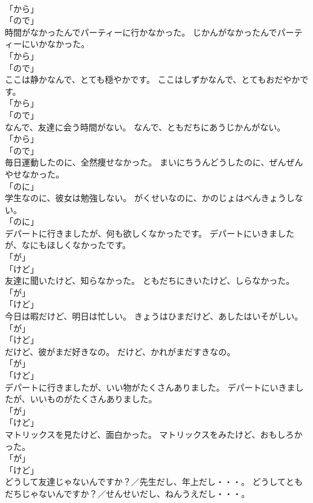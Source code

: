 \documentclass[8pt]{extreport}
\begin{document}
\begin{CJK}{UTF8}{min}
\\	「から」 
\\	「ので」	
\\	時間がなかったんでパーティーに行かなかった。	じかんがなかったんでパーティーにいかなかった。	
\\	「から」 
\\	「ので」	
\\	ここは静かなんで、とても穏やかです。	ここはしずかなんで、とてもおだやかです。	
\\	「から」 
\\	「ので」	
\\	なんで、友達に会う時間がない。	なんで、ともだちにあうじかんがない。	
\\	「から」 
\\	「ので」	
\\	毎日運動したのに、全然痩せなかった。	まいにちうんどうしたのに、ぜんぜんやせなかった。	
\\	「のに」 
\\	学生なのに、彼女は勉強しない。	がくせいなのに、かのじょはべんきょうしない。	
\\	「のに」 
\\	デパートに行きましたが、何も欲しくなかったです。	デパートにいきましたが、なにもほしくなかったです。	
\\	「が」 
\\	「けど」	
\\	友達に聞いたけど、知らなかった。	ともだちにきいたけど、しらなかった。	
\\	「が」 
\\	「けど」	
\\	今日は暇だけど、明日は忙しい。	きょうはひまだけど、あしたはいそがしい。	
\\	「が」 
\\	「けど」	
\\	だけど、彼がまだ好きなの。	だけど、かれがまだすきなの。	
\\	「が」 
\\	「けど」	
\\	デパートに行きましたが、いい物がたくさんありました。	デパートにいきましたが、いいものがたくさんありました。	
\\	「が」 
\\	「けど」	
\\	マトリックスを見たけど、面白かった。	マトリックスをみたけど、おもしろかった。	
\\	「が」 
\\	「けど」	
\\	どうして友達じゃないんですか？／先生だし、年上だし・・・。	どうしてともだちじゃないんですか？／せんせいだし、ねんうえだし・・・。	

\end{CJK}
\end{document}
